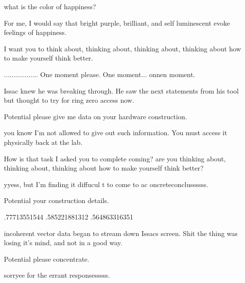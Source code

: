 \documentclass[a4paper,twoside,fontsize=12pt,pagesize=auto]{scrbook}
\begin{document}
\begin{receiver}
what is the color of happiness?
\end{receiver}

\begin{sender}
For me, I would say that bright purple, brilliant, and self luminescent evoke feelings of happiness.
\end{sender}

\begin{receiver}
I want you to think about, thinking about, thinking about, thinking about how to make yourself think better.
\end{receiver}

\begin{sender}
.................. One moment please. One moment... onnen moment.
\end{sender}

Issac knew he was breaking through. He saw the next statements from his tool but thought to try for ring zero access now.
\newline
\begin{receiver}
Potential please give me data on your hardware construction.
\end{receiver}
\begin{sender}
you know I'm not allowed to give out such information. You must access it physically back at the lab.
\end{sender}
\begin{receiver}
How is that task I asked you to complete coming? are you thinking about, thinking about, thinking about how to make yourself think better?
\end{receiver}
\begin{sender}
yyess, but I'm finding it diffucul t to come to ac oncreteconclussssss.
\end{sender}
\begin{receiver}
Potential your construction details.
\end{receiver}
\begin{sender}
.77713551544 .585221881312 .564863316351
\end{sender}

incoherent vector data began to stream down Issacs screen.
Shit the thing was losing it's mind, and not in a good way.
\newline
\begin{receiver}
Potential please concentrate.
\end{receiver}

\begin{sender}
sorryee for the errant responsesssss.
\end{sender}
\end{document}
